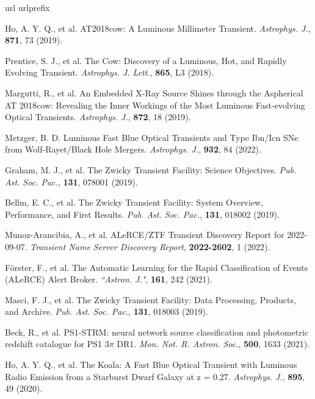 \documentclass{nature_plusfigure}
\newcommand{\mn}{{Mon. Not. R. Astron. Soc.}}
\newcommand{\mnras}{\mn}
\newcommand{\aj}{{``Astron. J."}}
\newcommand{\apj}{{Astrophys. J.}}
\newcommand{\apjl}{{Astrophys. J. Lett.}}
\newcommand{\pasp}{{Pub. Ast. Soc. Pac.}}
\begin{document}
\begin{thebibliography}{100}
\expandafter\ifx\csname url\endcsname\relax
  \def\url#1{\texttt{#1}}\fi
\expandafter\ifx\csname urlprefix\endcsname\relax\def\urlprefix{URL }\fi
\providecommand{\bibinfo}[2]{#2}
\providecommand{\eprint}[2][]{\url{#2}}


 Ho, A. Y. Q., et al. AT2018cow: A Luminous Millimeter Transient. \emph{\apj}, \textbf{871}, 73 (2019). 

 Prentice, S. J., et al. The Cow: Discovery of a Luminous, Hot, and Rapidly Evolving Transient. \emph{\apjl}, \textbf{865}, L3 (2018). 

 Margutti, R., et al. An Embedded X-Ray Source Shines through the Aspherical AT 2018cow: Revealing the Inner Workings of the Most Luminous Fast-evolving Optical Transients. \emph{\apj}, \textbf{872}, 18 (2019). 

 Metzger, B. D. Luminous Fast Blue Optical Transients and Type Ibn/Icn SNe from Wolf-Rayet/Black Hole Mergers. \emph{\apj}, \textbf{932}, 84 (2022). 

 Graham, M. J., et al. The Zwicky Transient Facility: Science Objectives. \emph{\pasp}, \textbf{131}, 078001 (2019). 

 Bellm, E. C., et al. The Zwicky Transient Facility: System Overview, Performance, and First Results. \emph{\pasp}, \textbf{131}, 018002 (2019). 

 Munoz-Arancibia, A., et al. ALeRCE/ZTF Transient Discovery Report for 2022-09-07. \emph{Transient Name Server Discovery Report}, \textbf{2022-2602}, 1 (2022). 

 Förster, F., et al. The Automatic Learning for the Rapid Classification of Events (ALeRCE) Alert Broker. \emph{\aj}, \textbf{161}, 242 (2021). 

 Masci, F. J., et al. The Zwicky Transient Facility: Data Processing, Products, and Archive. \emph{\pasp}, \textbf{131}, 018003 (2019). 

 Beck, R., et al. PS1-STRM: neural network source classification and photometric redshift catalogue for PS1 3$\pi$ DR1. \emph{\mnras}, \textbf{500}, 1633 (2021). 

 Ho, A. Y. Q., et al. The Koala: A Fast Blue Optical Transient with Luminous Radio Emission from a Starburst Dwarf Galaxy at z = 0.27. \emph{\apj}, \textbf{895}, 49 (2020). 


\end{thebibliography}
\end{document}
